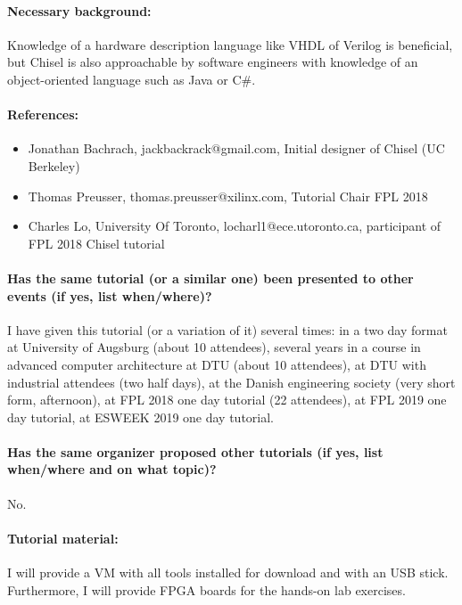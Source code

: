 \documentclass{article}
\begin{document}
 \paragraph{Necessary background:}

Knowledge of a hardware description language like VHDL of Verilog is beneficial, but Chisel is also
approachable by software engineers with knowledge of an object-oriented language such as Java or C\#.

 \paragraph{References:}

\begin{itemize}
\item Jonathan Bachrach, jackbackrack@gmail.com, Initial designer of Chisel (UC Berkeley)
\item Thomas Preusser, thomas.preusser@xilinx.com, Tutorial Chair FPL 2018
\item Charles Lo, University Of Toronto, locharl1@ece.utoronto.ca, participant of FPL 2018 Chisel tutorial
\end{itemize}

\paragraph{Has the same tutorial (or a similar one) been presented to other events (if yes, list when/where)?}

I have given this tutorial (or a variation of it) several times:
in a two day format at University of Augsburg (about 10 attendees), several years
in a course in advanced computer architecture at DTU (about 10 attendees), at DTU with industrial attendees
(two half days), at the Danish engineering society (very short form, afternoon),
at FPL 2018 one day tutorial (22 attendees), at FPL 2019 one day tutorial,
at ESWEEK 2019 one day tutorial.

\paragraph{Has the same organizer proposed other tutorials (if yes, list when/where and on what topic)?}

No.

 \paragraph{Tutorial material:} I will provide a VM with all tools installed for download and with an USB stick. Furthermore, I will provide FPGA boards for the hands-on lab exercises.
 
\end{document}
